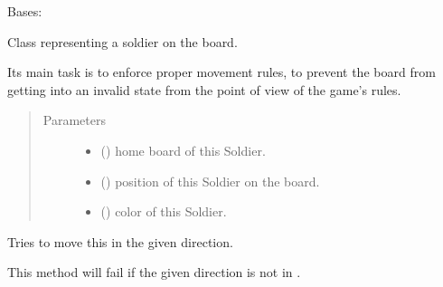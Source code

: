\documentclass[letterpaper,10pt,english,openany,oneside]{sphinxmanual}
\begin{document}
\begin{fulllineitems}
\label{\detokenize{neutron:neutron.Soldier}}
Bases: 

Class representing a soldier on the board.

Its main task is to enforce proper movement rules, to prevent the board
from getting into an invalid state from the point of view of the game’s
rules.
\begin{quote}\begin{description}
\item[{Parameters}] \leavevmode\begin{itemize}
\item {} 
 ({\hyperref[\detokenize{neutron:neutron.NeutronBoard}]{}}) \textendash{} home board of this Soldier.

\item {} 
 ({\hyperref[\detokenize{util:util.Vec}]{}}) \textendash{} position of this Soldier on the board.

\item {} 
 () \textendash{} color of this Soldier.

\end{itemize}

\end{description}\end{quote}

\begin{fulllineitems}
\label{\detokenize{neutron:neutron.Soldier.move}}
Tries to move this {\hyperref[\detokenize{neutron:neutron.Soldier}]{}} in the given direction.

This method will fail if the given direction is not in
{\hyperref[\detokenize{neutron:neutron.Soldier.possible_directions}]{}}.


\end{fulllineitems}
\end{fulllineitems}
\end{document}
